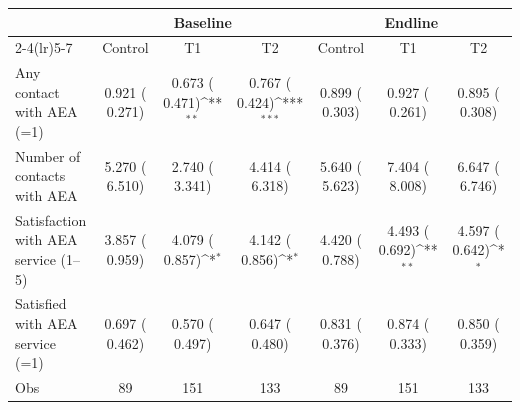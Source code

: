 \def\sym#1{\ifmmode^{#1}\else\(^{#1}\)\fi}
\begin{tabular}{lcccccc}
\toprule
 & \multicolumn{3}{c}{Baseline} & \multicolumn{3}{c}{Endline} \\
\cmidrule(lr){2-4}\cmidrule(lr){5-7}
 & Control & T1 & T2 & Control & T1 & T2 \\
\midrule
Any contact with AEA (=1) &     0.921 (    0.271) &     0.673 (    0.471)\sym{**} &     0.767 (    0.424)\sym{***} &     0.899 (    0.303) &     0.927 (    0.261) &     0.895 (    0.308) \\
Number of contacts with AEA &     5.270 (    6.510) &     2.740 (    3.341) &     4.414 (    6.318) &     5.640 (    5.623) &     7.404 (    8.008) &     6.647 (    6.746) \\
Satisfaction with AEA service (1--5) &     3.857 (    0.959) &     4.079 (    0.857)\sym{*} &     4.142 (    0.856)\sym{*} &     4.420 (    0.788) &     4.493 (    0.692)\sym{**} &     4.597 (    0.642)\sym{*} \\
Satisfied with AEA service (=1) &     0.697 (    0.462) &     0.570 (    0.497) &     0.647 (    0.480) &     0.831 (    0.376) &     0.874 (    0.333) &     0.850 (    0.359) \\
\midrule
Obs &        89 &       151 &       133 &        89 &       151 &       133 \\
\bottomrule
\end{tabular}
